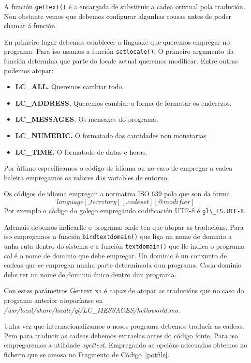 A función \lstinline{gettext()} é a encargada de substituír a cadea orixinal pola tradución. Non obstante vemos que debemos configurar algunhas cousas antes de poder chamar á función.

En primeiro lugar debemos establecer a linguaxe que queremos empregar no programa. Para iso usamos a función \lstinline{setlocale()}. O primeiro argumento da función determina que parte do locale actual queremos modificar. Entre outras podemos atopar:

\begin{itemize}
    \item \textbf{LC\_ALL.} Queremos cambiar todo.
    \item \textbf{LC\_ADDRESS.} Queremos cambiar a forma de formatar os enderezos.
    \item \textbf{LC\_MESSAGES.} Os mensaxes do programa.
    \item \textbf{LC\_NUMERIC.} O formatado das cantidades non monetarias
    \item \textbf{LC\_TIME.} O formatado de datas e horas.
\end{itemize}

Por último especificamos o código de idioma ou no caso de empregar a cadea baleira empregamos os valores das variables de entorno.

Os códigos de idioma empregan a normativa ISO 639 polo que son da forma $$language[\_territory][.codeset][@modifier]$$ Por exemplo o código do galego empregando codificación UTF-8 é \lstinline{gl\_ES.UTF-8}.

Ademais debemos indicarlle o programa onde ten que atopar as traducións. Para iso empregamos a función \lstinline{bindtextdomain()} que liga un nome de dominio a unha ruta dentro do sistema e a función \lstinline{textdomain()} que lle indica o programa cal é o nome de dominio que debe empregar. Un dominio é un conxunto de cadeas que se empregan nunha parte determinada dun programa. Cada dominio debe ter un nome de dominio único dentro dun programa.

Con estes parámetros Gettext xa é capaz de atopar as traducións que no caso do programa anterior atoparíanse en \emph{/usr/local/share/locale/gl/LC\_MESSAGES/helloworld.mo}.

Unha vez que internacionalizamos o nosos programa debemos traducir as cadeas. Pero para traducir as cadeas debemos extraelas antes do código fonte. Para iso empregaremos a utilidade \emph{xgettext}. Empregando as opcións adecuadas obtemos no ficheiro que se amosa no Fragmento de Código~\ref{potfile}.

